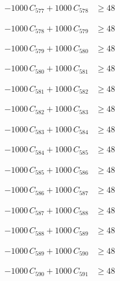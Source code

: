 \documentclass[a4paper,11pt]{article}
\begin{document}
\begin{align}
-1000\,C_{577} + 1000\,C_{578} &\geq 48 \nonumber
\end{align}

\begin{align}
-1000\,C_{578} + 1000\,C_{579} &\geq 48 \nonumber
\end{align}

\begin{align}
-1000\,C_{579} + 1000\,C_{580} &\geq 48 \nonumber
\end{align}

\begin{align}
-1000\,C_{580} + 1000\,C_{581} &\geq 48 \nonumber
\end{align}

\begin{align}
-1000\,C_{581} + 1000\,C_{582} &\geq 48 \nonumber
\end{align}

\begin{align}
-1000\,C_{582} + 1000\,C_{583} &\geq 48 \nonumber
\end{align}

\begin{align}
-1000\,C_{583} + 1000\,C_{584} &\geq 48 \nonumber
\end{align}

\begin{align}
-1000\,C_{584} + 1000\,C_{585} &\geq 48 \nonumber
\end{align}

\begin{align}
-1000\,C_{585} + 1000\,C_{586} &\geq 48 \nonumber
\end{align}

\begin{align}
-1000\,C_{586} + 1000\,C_{587} &\geq 48 \nonumber
\end{align}

\begin{align}
-1000\,C_{587} + 1000\,C_{588} &\geq 48 \nonumber
\end{align}

\begin{align}
-1000\,C_{588} + 1000\,C_{589} &\geq 48 \nonumber
\end{align}

\begin{align}
-1000\,C_{589} + 1000\,C_{590} &\geq 48 \nonumber
\end{align}

\begin{align}
-1000\,C_{590} + 1000\,C_{591} &\geq 48 \nonumber
\end{align}
\end{document}
